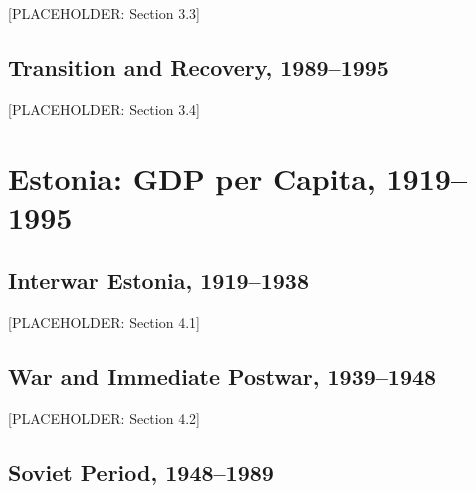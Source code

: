 \documentclass[12pt,a4paper]{article}
\begin{document}
[PLACEHOLDER: Section 3.3]

\subsection{Transition and Recovery, 1989--1995}
\label{sec:latvia-transition}

[PLACEHOLDER: Section 3.4]

\begin{table}[H]
  \centering
  \caption{Latvia: GDP per Capita, Decennial Benchmarks}
  \label{tab:latvia-gdp}
  
\end{table}


\section{Estonia: GDP per Capita, 1919--1995}
\label{sec:estonia}

\subsection{Interwar Estonia, 1919--1938}
\label{sec:estonia-interwar}

[PLACEHOLDER: Section 4.1]

\subsection{War and Immediate Postwar, 1939--1948}
\label{sec:estonia-war}

[PLACEHOLDER: Section 4.2]

\subsection{Soviet Period, 1948--1989}
\label{sec:estonia-soviet}
\end{document}
